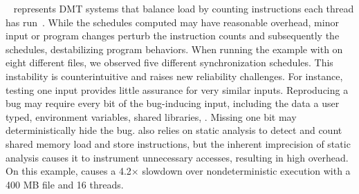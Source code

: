 \coredet~\cite{coredet:asplos10} represents DMT systems that balance load
by counting instructions each thread has run~\cite{coredet:asplos10,
 kendo:asplos09, dmp:asplos09, dos:osdi10, ddos:asplos13}.  While the
schedules computed may have reasonable overhead, minor input or program
changes perturb the instruction counts and subsequently the schedules,
destabilizing program behaviors.  When running the example
with \coredet on eight different files, we observed
five different synchronization schedules.  This instability is
counterintuitive and raises new reliability challenges.  For instance,
testing one input provides little assurance for very similar inputs.
Reproducing a bug may require every bit of the bug-inducing input,
including the data a user typed, environment variables, shared libraries,
\etc. Missing one bit may deterministically hide the bug.  \coredet also
relies on static analysis to detect and count shared memory load and store
instructions, but the inherent imprecision of static analysis causes it to
instrument unnecessary accesses, resulting in high overhead.  On this
example, \coredet causes a 4.2$\times$ slowdown over nondeterministic execution with a 400
MB file and 16 threads.



